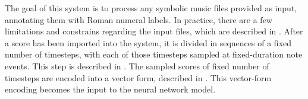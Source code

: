 

The goal of this system is to process any symbolic music
files provided as input, annotating them with Roman numeral
labels. In practice, there are a few limitations and
constrains regarding the input files, which are described in
. After a score has
been imported into the system, it is divided in sequences of
a fixed number of timesteps, with each of those timesteps
sampled at fixed-duration note events. This step is
described in . The sampled
scores of fixed number of timesteps are encoded into a
vector form, described in .
This vector-form encoding becomes the input to the neural
network model.
